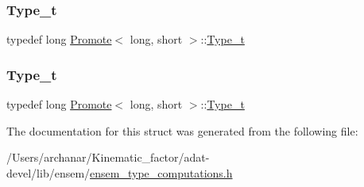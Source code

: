 \subsubsection{\texorpdfstring{Type\_t}{Type\_t}\hspace{0.1cm}{\footnotesize\ttfamily [2/3]}}
{\footnotesize\ttfamily typedef long \mbox{\hyperlink{structPromote}{Promote}}$<$ long, short $>$\+::\mbox{\hyperlink{structPromote_3_01long_00_01short_01_4_ac27097b9e5d53eee395af8cb8beb6cc1}{Type\+\_\+t}}}

\mbox{\label{structPromote_3_01long_00_01short_01_4_ac27097b9e5d53eee395af8cb8beb6cc1}} 
\subsubsection{\texorpdfstring{Type\_t}{Type\_t}\hspace{0.1cm}{\footnotesize\ttfamily [3/3]}}
{\footnotesize\ttfamily typedef long \mbox{\hyperlink{structPromote}{Promote}}$<$ long, short $>$\+::\mbox{\hyperlink{structPromote_3_01long_00_01short_01_4_ac27097b9e5d53eee395af8cb8beb6cc1}{Type\+\_\+t}}}



The documentation for this struct was generated from the following file\+:\begin{DoxyCompactItemize}
\item 
/\+Users/archanar/\+Kinematic\+\_\+factor/adat-\/devel/lib/ensem/\mbox{\hyperlink{adat-devel_2lib_2ensem_2ensem__type__computations_8h}{ensem\+\_\+type\+\_\+computations.\+h}}\end{DoxyCompactItemize}
